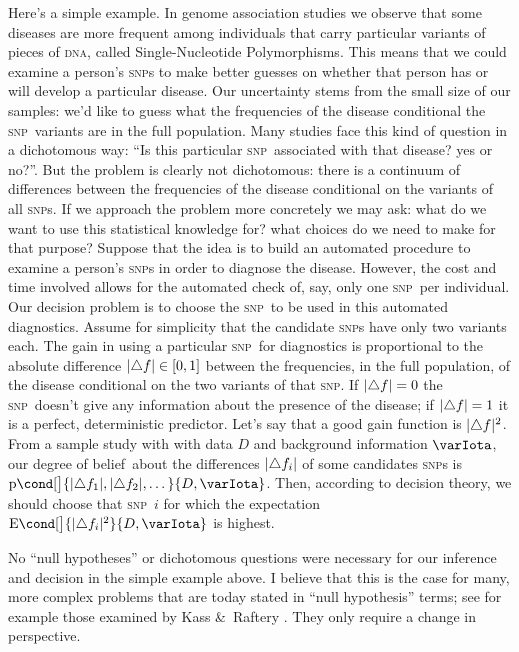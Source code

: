 \documentclass[\ifafour a4paper,12pt,\else a5paper,10pt,\fi%
onecolumn,oneside,article,%
british%
]{memoir}
\theoremstyle{remark}
\theoremstyle{innote}
\newcommand*{\citey}{\parencites*}
\newcommand*{\amp}{\&}
\newcommand*{\incr}{\triangle}%
\DeclarePairedDelimiter\clcl{[}{]}
\DeclarePairedDelimiter\abs{\lvert}{\rvert}
\newcommand*{\pf}{\mathrm{p}}%
\newcommand*{\E}{\mathrm{E}}
\renewcommand*{\|}{\nonscript\,\vert\nonscript\;\mathopen{}}
\newcommand*{\sect}{\S}%
\newcommand*{\dob}{degree of belief}
\newcommand*{\yI}{\varIota}
\newcommand*{\yD}{D}
\newcommand*{\snp}{\textsc{snp}}
\begin{document}
Here's a simple example. In genome association studies we observe that some
diseases are more frequent among individuals that carry particular variants
of pieces of \textsc{dna}, called Single-Nucleotide Polymorphisms. This
means that we could examine a person's \snp s to make better guesses on
whether that person has or will develop a particular disease. Our
uncertainty stems from the small size of our samples: we'd like to guess
what the frequencies of the disease conditional the \snp\ variants are in
the full population. Many studies face this kind of question in a
dichotomous way: \enquote{Is this particular \snp\ associated with that
  disease? yes or no?}. %
But the problem is clearly not dichotomous: there is a continuum of
differences between the frequencies of the disease conditional on the
variants of all \snp s. If we approach the problem more concretely we may
ask: what do we want to use this statistical knowledge for? what choices do
we need to make for that purpose? Suppose that the idea is to build an
automated procedure to examine a person's \snp s in order to diagnose the
disease. However, the cost and time involved allows for the automated check
of, say, only one \snp\ per individual. Our decision problem is to choose
the \snp\ to be used in this automated diagnostics. Assume for simplicity
that the candidate \snp s have only two variants each. The gain in using a
particular \snp\ for diagnostics is proportional to the absolute difference
$\abs{\incr f} \in \clcl{0,1}$ between the frequencies, in the full
population, of the disease conditional on the two variants of that \snp. If
$\abs{\incr f} = 0$ the \snp\ doesn't give any information about the
presence of the disease; if $\abs{\incr f} = 1$ it is a perfect,
deterministic predictor. Let's say that a good gain function is
$\abs{\incr f}^2$. From a sample study with with data $\yD$ and background
information $\yI$, our \dob\ about the differences $\abs{\incr f_i}$ of
some candidates \snp s is
$\pf\cond[\big]{\abs{\incr f_1}, \abs{\incr f_2}, \dotsc}{\yD, \yI}$. Then,
according to decision theory, we should choose that \snp\ $i$ for which the
expectation $\E\cond[\big]{\abs{\incr f_i}^2}{\yD, \yI}$ is highest.


No \enquote{null hypotheses} or dichotomous questions were necessary for
our inference and decision in the simple example above. I believe that this
is the case for many, more complex problems that are today stated in
\enquote{null hypothesis} terms; see for example those examined by Kass
\amp\ Raftery \citey[\sect~2]{kassetal1995}. They only require a change in
perspective.
\end{document}
